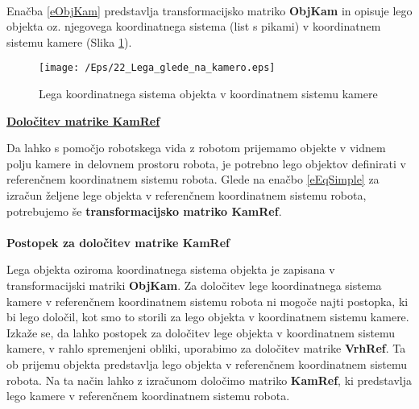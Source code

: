 \\
\begin{mdframed}[backgroundcolor=blue!20, shadow=true,roundcorner=8pt]
        \vspace{0.1cm}
Enačba \ref{eObjKam} predstavlja transformacijsko matriko
\textbf{ObjKam} in opisuje lego objekta oz. njegovega koordinatnega
sistema (list s pikami) v koordinatnem sistemu kamere (Slika
\ref{fTransfOK}).
        \vspace{0.1cm}
\end{mdframed}

\begin{figure}[b]
    \center
    \texttt{[image: /Eps/22\_Lega\_glede\_na\_kamero.eps]}
    \vspace{-0.3cm}
    \caption{Lega koordinatnega sistema objekta v koordinatnem sistemu kamere}
    \label{fTransfOK}
\end{figure}

\noindent %
\textbf{\underline{Določitev matrike KamRef}} %

\vspace{0.3cm}%
Da lahko s pomočjo robotskega vida z robotom prijemamo objekte v
vidnem polju kamere in delovnem prostoru robota, je potrebno lego
objektov definirati v referenčnem koordinatnem sistemu robota. Glede
na enačbo \ref{eEqSimple} za izračun željene lege objekta v
referenčnem koordinatnem sistemu robota, potrebujemo še
\textbf{transformacijsko matriko KamRef}.
\\
\\
\noindent %
\textbf{Postopek za določitev matrike KamRef} %
\vspace{0.1cm}\\
\begin{mdframed}[backgroundcolor=green!20, shadow=true,roundcorner=8pt]
        \vspace{0.1cm}
Lega objekta oziroma koordinatnega sistema objekta je zapisana v
transformacijski matriki \textbf{ObjKam}. Za določitev lege
koordinatnega sistema kamere v referenčnem koordinatnem sistemu
robota ni mogoče najti postopka, ki bi lego določil, kot smo to
storili za lego objekta v koordinatnem sistemu kamere. Izkaže se, da
lahko postopek za določitev lege objekta v koordinatnem sistemu
kamere, v rahlo spremenjeni obliki, uporabimo za določitev matrike
\textbf{VrhRef}. Ta ob prijemu objekta predstavlja lego objekta v
referenčnem koordinatnem sistemu robota. Na ta način lahko z
izračunom določimo matriko \textbf{KamRef}, ki predstavlja lego
kamere v referenčnem koordinatnem sistemu robota.
        \vspace{0.1cm}
\end{mdframed}

